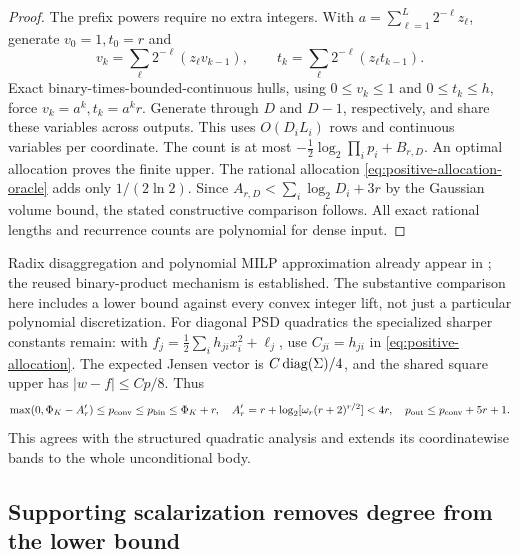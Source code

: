 \begin{proof}
The prefix powers require no extra integers. With
$a=\sum_{\ell=1}^L2^{-\ell}z_\ell$, generate $v_0=1,t_0=r$ and
\begin{equation}\label{eq:exact-prefix-powers}
 v_k=\sum_\ell2^{-\ell}(z_\ell v_{k-1}),\qquad
 t_k=\sum_\ell2^{-\ell}(z_\ell t_{k-1}).
\end{equation}
Exact binary-times-bounded-continuous hulls, using $0\le v_k\le1$
and $0\le t_k\le h$, force $v_k=a^k,t_k=a^kr$. Generate through
$D$ and $D-1$, respectively, and share these variables across outputs.
This uses $O(D_iL_i)$ rows and continuous variables per coordinate.
The count is at most $-\frac12\log_2\prod_ip_i+B_{r,D}$.
An optimal allocation proves the finite upper. The rational allocation
\eqref{eq:positive-allocation-oracle} adds only $1/(2\ln2)$.
Since $A_{r,D}<\sum_i\log_2D_i+3r$ by the Gaussian volume bound,
the stated constructive comparison follows. All exact rational lengths
and recurrence counts are polynomial for dense input.
\end{proof}

Radix disaggregation and polynomial MILP approximation already appear in
\citet{teles2013}; the reused binary-product mechanism is established.
The substantive comparison here includes a lower bound against every
convex integer lift, not just a particular polynomial discretization.
For diagonal PSD quadratics the specialized sharper constants remain:
with $f_j=\frac12\sum_ih_{ji}x_i^2+\ell_j$, use $C_{ji}=h_{ji}$
in \eqref{eq:positive-allocation}. The expected Jensen vector is
$C\operatorname{diag}(\Sigma)/4$, and the shared square upper has
$|w-f|\le Cp/8$. Thus
\begin{equation}\label{eq:unconditional-diagonal-sharp}
 \max(0,\Phi_K-A_r')\le p_{\mathrm{conv}}\le p_{\mathrm{bin}}\le\Phi_K+r,
 \quad A_r'=r+\log_2[\omega_r(r+2)^{r/2}]<4r,
 \quad p_{\mathrm{out}}\le p_{\mathrm{conv}}+5r+1.
\end{equation}
This agrees with the structured quadratic analysis and extends its
coordinatewise bands to the whole unconditional body.

\subsection{Supporting scalarization removes degree from the lower bound}

